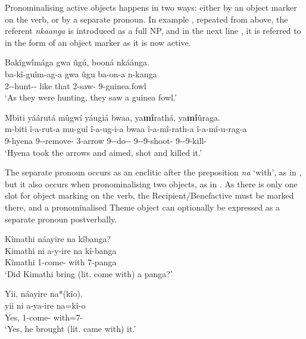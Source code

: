 \documentclass[output=paper]{langscibook}
\begin{document}
Pronominalising active objects happens in two ways: either by an object marker on the verb, or by a separate pronoun. In example , repeated from above, the referent \textit{nkaanga} is introduced as a full NP, and in the next line , it is referred to in the form of an object marker as it is now active.

\ea
\label{bkm:Ref116889996}
Bakîgw\'{î}mága gwa ûgú, booná nkáánga.\\
\gll
ba-kî-guîm-ag-a  gwa  ûgu  ba-on-a  n-kanga\\
2\SM-\DEP{}-hunt-\HAB-\FV{} like that 2\SM{}-saw-\FV{} 9-guinea.fowl\\
\glt
‘As they were hunting, they saw a guinea fowl.’

\z

\ea
\label{bkm:Ref132196481}
Mbiti yáárutá mûgwí yáugiá bwaa, ya\textbf{mî}rathá, ya\textbf{mî}ûraga.\\
\gll
m-biti  î-a-rut-a  mu-guî  î-a-ug-i-a  bwaa î-a-mî-rath-a  î-a-mî-u-rag-a \\
9-hyena 9\SM-\PST{}-remove-\FV{} 3-arrow 9\SM-\PST{}-do-\IC-\FV{} \IDEO{} 9\SM-\PST{}-9\OM{}-shoot-\FV{} 9\SM-\PST{}-9\OM{}-kill-\FV{} \\
\glt
‘Hyena took the arrows and aimed, shot and killed it.’

\z

The separate pronoun occurs as an enclitic after the preposition \textit{na} ‘with’, as in , but it also occurs when pronominalising two objects, as in . As there is only one slot for object marking on the verb, the Recipient/Benefactive must be marked there, and a pronominalised Theme object can optionally be expressed as a separate pronoun postverbally.

\ea
\label{bkm:Ref116889769}
\ea
Kîmathi náayire na kîbanga?\\
\gll
Kimathi  ni  a-y-ire  na  kî-banga\\
Kîmathi \FOC{}  1\SM{}-come-\PFV{} with  7-panga\\
\glt
‘Did Kimathi bring (lit. come with) a panga?'

\ex
Yii, náayire na*(kîo).\\
\gll
yii  ni  a-ya-ire  na=kî-o\\
Yes, \FOC{}  1\SM{}-come-\PFV{} with=7-\PRO{}\\
\glt
‘Yes, he brought (lit. came with) it.’
\end{document}
